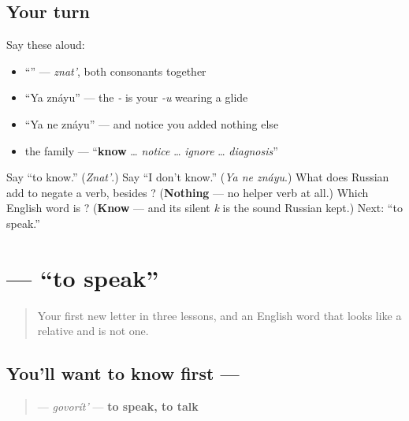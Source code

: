 \subsection*{Your turn}
Say these aloud:

\begin{itemize}
\raggedright
  \item \textquotedblleft{}\textquotedblright{} — \emph{znat'}, both consonants together
  \item \textquotedblleft{}Ya znáyu\textquotedblright{} — the \emph{-} is your \emph{-u} wearing a glide
  \item \textquotedblleft{}Ya ne znáyu\textquotedblright{} — and notice you added nothing else
  \item the family — \textquotedblleft{}\textbf{know} … \emph{notice} … \emph{ignore} … \emph{diagnosis}\textquotedblright{}
\end{itemize}

\begin{tcolorbox}[breakable,colback=teal!4,colframe=teal!35!black,title={Before you move on}]
Say \textquotedblleft{}to know.\textquotedblright{} (\emph{Znat'}.) Say \textquotedblleft{}I don't know.\textquotedblright{} (\emph{Ya ne znáyu}.) What does Russian add to negate a verb, besides \textbf{}? (\textbf{Nothing} — no helper verb at all.) Which English word is \emph{}? (\textbf{Know} — and its silent \emph{k} is the sound Russian kept.) Next: \textquotedblleft{}to speak.\textquotedblright{}
\end{tcolorbox}
\section[\texorpdfstring{\ru{говорить} (govorít')}{говорить (govorít')}]{ — \textquotedblleft{}to speak\textquotedblright{}}

\label{lesson:RU-C03-govorit}



\begin{quote}
Your first new letter in three lessons, and an English word that looks like a relative and is not one.
\end{quote}

\subsection*{You'll want to know first — }
\begin{quote}
\textbf{} — \emph{govorít'} — \textbf{to speak, to talk}
\end{quote}

